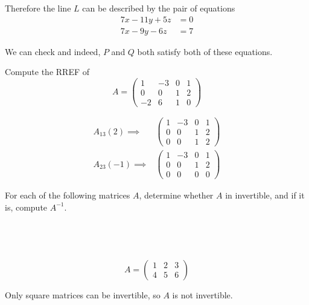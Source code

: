 \documentclass[a4paper]{article}
\begin{document}
Therefore the line $L$ can be described by the pair of equations \begin{align*}
7x - 11y + 5z &= 0\\
7x - 9y - 6z &= 7
\end{align*}

We can check and indeed, $P$ and $Q$ both satisfy both of these equations.


\begin{questionbody}
Compute the RREF of $$A = \begin{pmatrix}
1 & -3 & 0 & 1\\
0 & 0 & 1 & 2\\
-2 & 6 & 1 & 0
\end{pmatrix}$$
\end{questionbody}

\begin{align*}
A_{13}(2) \implies &\begin{pmatrix}
	1 & -3 & 0 & 1\\
	0 & 0 & 1 & 2\\
	0 & 0 & 1 & 2
\end{pmatrix}\\[1ex]
A_{23}(-1) \implies &\begin{pmatrix}
	1 & -3 & 0 & 1\\
	0 & 0 & 1 & 2\\
	0 & 0 & 0 & 0
\end{pmatrix}
\end{align*}


\begin{questionbody}
For each of the following matrices $A$, determine whether $A$ in invertible, and if it is, compute $A^{-1}$.
\end{questionbody}

\subsection{~} %

\begin{questionbody}
$$A = \begin{pmatrix}1 & 2 & 3\\ 4 & 5 & 6\end{pmatrix}$$
\end{questionbody}

Only square matrices can be invertible, so $A$ is not invertible.
\end{document}
